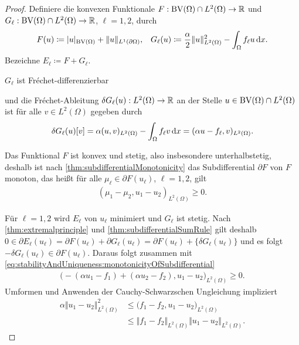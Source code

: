 \begin{proof}
  Definiere die konvexen Funktionale $F:\textup{BV}(\Omega)\cap L^2(\Omega)\to \mathbb{R}$
  und 
  $G_\ell:\textup{BV}(\Omega)\cap L^2(\Omega)\to \mathbb{R}$, $\ell=1,2$, durch
  \begin{align*}
    F(u) &\coloneqq |u|_{\textup{BV}(\Omega)} + \Vert u \Vert_{L^1(\partial\Omega)},&
    G_\ell(u)\coloneqq \frac{\alpha}{2}\Vert u\Vert_{L^2(\Omega)}^2 -
    \int_\Omega f_\ell u\,\mathrm{d}x.
  \end{align*}
  Bezeichne $E_\ell\coloneqq F+G_\ell$.

  $G_\ell$ ist Fr\'echet-differenzierbar 


  und die Fr\'echet-Ableitung $\delta G_\ell(u):
  L^2(\Omega)\to\mathbb{R}$ an der
  Stelle
  $u\in \textup{BV}(\Omega)\cap L^2(\Omega)$ ist 
  für alle $v\in L^2(\Omega)$ gegeben durch
  \begin{align*}
    \delta G_\ell(u)[v] = \alpha (u,v)_{L^2(\Omega)} - \int_\Omega f_\ell v\,\mathrm{d}x 
    = (\alpha u-f_\ell ,v)_{L^2(\Omega)}.
  \end{align*}

  Das Funktional $F$ ist konvex 
  und stetig, also insbesondere unterhalbstetig, deshalb 
  ist nach \cref{thm:subdifferentialMonotonicity} das
  Subdifferential
  $\partial F$ von $F$ monoton, das heißt für alle $\mu_\ell\in \partial
  F(u_\ell)$, $\ell=1,2$, gilt
  \begin{align}\label{eq:stabilityAndUniqueness:monotonicityOfSubdifferential}
    (\mu_1-\mu_2,u_1-u_2)_{L^2(\Omega)}\geq 0.
  \end{align}

  Für $\ell=1,2$ wird $E_\ell$ von $u_\ell$ minimiert und $G_\ell$ ist stetig.
  Nach \cref{thm:extremalprinciple} und
  \cref{thm:subdifferentialSumRule} gilt deshalb $0\in\partial E_\ell(u_\ell)
  = \partial F(u_\ell)+\partial G_\ell(u_\ell)=\partial F(u_\ell)+
  \{\delta G_\ell(u_\ell)\}$ 
  und es folgt
  $-\delta G_\ell(u_\ell)\in\partial F(u_\ell)$.
  Daraus folgt zusammen mit
  \eqref{eq:stabilityAndUniqueness:monotonicityOfSubdifferential}
  \begin{align*}
    \big( -(\alpha u_1 - f_1) + (\alpha u_2 - f_2), u_1 - u_2\big)_{L^2(\Omega)}
    \geq 0.
  \end{align*}
  Umformen und Anwenden der Cauchy-Schwarzschen Ungleichung impliziert
  \begin{align*}
    \alpha \Vert u_1 - u_2 \Vert_{L^2(\Omega)}^2
    &\leq
    \big(f_1 -f_2, u_1-u_2 \big)_{L^2(\Omega)}\\
    &\leq
    \Vert f_1-f_2\Vert_{L^2(\Omega)}\Vert u_1 - u_2\Vert_{L^2(\Omega)}.
  \end{align*}


\end{proof}
